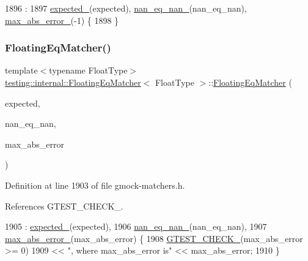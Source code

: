 \begin{DoxyCode}
1896                                                          :
1897     \hyperlink{classtesting_1_1internal_1_1FloatingEqMatcher_a01d4d3ee6344cd3d88c53dd6e730b9df}{expected\_}(expected), \hyperlink{classtesting_1_1internal_1_1FloatingEqMatcher_a782b06cb55b4989c3c67facf910265bf}{nan\_eq\_nan\_}(nan\_eq\_nan), 
      \hyperlink{classtesting_1_1internal_1_1FloatingEqMatcher_a06b3fd6f9ee60bc694a12ccaeba2924a}{max\_abs\_error\_}(-1) \{
1898   \}
\end{DoxyCode}
\mbox{\label{classtesting_1_1internal_1_1FloatingEqMatcher_a07674c4b017965493a3c20a218f9a74f}} 
\subsubsection{\texorpdfstring{Floating\+Eq\+Matcher()}{FloatingEqMatcher()}\hspace{0.1cm}{\footnotesize\ttfamily [2/2]}}
{\footnotesize\ttfamily template$<$typename Float\+Type$>$ \\
\hyperlink{classtesting_1_1internal_1_1FloatingEqMatcher}{testing\+::internal\+::\+Floating\+Eq\+Matcher}$<$ Float\+Type $>$\+::\hyperlink{classtesting_1_1internal_1_1FloatingEqMatcher}{Floating\+Eq\+Matcher} (\begin{DoxyParamCaption}\item[{Float\+Type}]{expected,  }\item[{\hyperlink{classbool}{bool}}]{nan\+\_\+eq\+\_\+nan,  }\item[{Float\+Type}]{max\+\_\+abs\+\_\+error }\end{DoxyParamCaption})\hspace{0.3cm}{\ttfamily [inline]}}



Definition at line 1903 of file gmock-\/matchers.\+h.



References G\+T\+E\+S\+T\+\_\+\+C\+H\+E\+C\+K\+\_\+.


\begin{DoxyCode}
1905       : \hyperlink{classtesting_1_1internal_1_1FloatingEqMatcher_a01d4d3ee6344cd3d88c53dd6e730b9df}{expected\_}(expected),
1906         \hyperlink{classtesting_1_1internal_1_1FloatingEqMatcher_a782b06cb55b4989c3c67facf910265bf}{nan\_eq\_nan\_}(nan\_eq\_nan),
1907         \hyperlink{classtesting_1_1internal_1_1FloatingEqMatcher_a06b3fd6f9ee60bc694a12ccaeba2924a}{max\_abs\_error\_}(max\_abs\_error) \{
1908     \hyperlink{gtest-port_8h_ab54343f0a36dc4cb0ce8a478dd7847b8}{GTEST\_CHECK\_}(max\_abs\_error >= 0)
1909         << \textcolor{stringliteral}{", where max\_abs\_error is"} << max\_abs\_error;
1910   \}
\end{DoxyCode}


